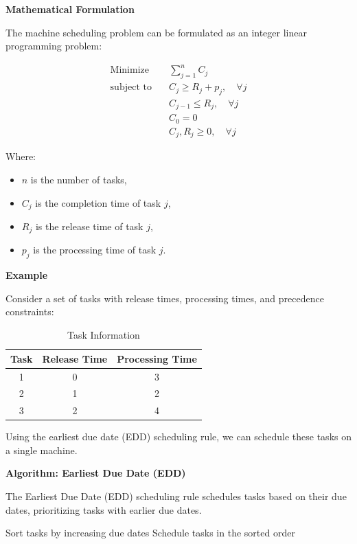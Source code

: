 \documentclass[12pt]{book} %
\begin{document}
\textbf{Mathematical Formulation}

The machine scheduling problem can be formulated as an integer linear programming problem:

\[
\begin{aligned}
\text{Minimize} \quad & \sum_{j=1}^{n} C_j \\
\text{subject to} \quad & C_j \geq R_j + p_j, \quad \forall j \\
& C_{j-1} \leq R_j, \quad \forall j \\
& C_0 = 0 \\
& C_j, R_j \geq 0, \quad \forall j
\end{aligned}
\]

Where:
\begin{itemize}
    \item $n$ is the number of tasks,
    \item $C_j$ is the completion time of task $j$,
    \item $R_j$ is the release time of task $j$,
    \item $p_j$ is the processing time of task $j$.
\end{itemize}

\textbf{Example}

Consider a set of tasks with release times, processing times, and precedence constraints:

\begin{table}[H]
    \centering
    \begin{tabular}{|c|c|c|}
    \hline
    Task & Release Time & Processing Time \\
    \hline
    1 & 0 & 3 \\
    2 & 1 & 2 \\
    3 & 2 & 4 \\
    \hline
    \end{tabular}
    \caption{Task Information}
\end{table}

Using the earliest due date (EDD) scheduling rule, we can schedule these tasks on a single machine.

\textbf{Algorithm: Earliest Due Date (EDD)}

The Earliest Due Date (EDD) scheduling rule schedules tasks based on their due dates, prioritizing tasks with earlier due dates.
\FloatBarrier
\begin{algorithm}[H]
\caption{Earliest Due Date (EDD) Algorithm}\label{alg:edd}
\begin{algorithmic}[1]
    \State Sort tasks by increasing due dates
    \State Schedule tasks in the sorted order
\EndProcedure
\end{algorithmic}
\end{algorithm}
\FloatBarrier
\end{document}
